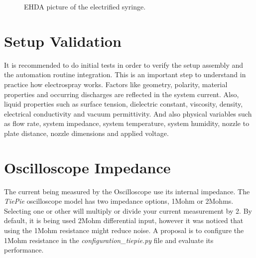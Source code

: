 \begin{figure}[H]
    \centering
    \label{fig:nozzleElectr}
    \caption{EHDA picture of the electrified syringe.}
\end{figure}


\section{Setup Validation}
\label{sec:setup_validation}


It is recommended to do initial tests in order to verify the setup assembly and the automation routine integration. 
This is an important step to understand in practice how electrospray works.
Factors like geometry, polarity, material properties and occurring discharges are reflected in the system current.
Also, liquid properties such as surface tension, dielectric constant, viscosity, density, electrical conductivity and vacuum permittivity. 
And also physical variables such as flow rate, system impedance, system temperature, system humidity, nozzle to plate distance, nozzle dimensions and applied voltage.


\section{Oscilloscope Impedance}
\label{sec:osc_impedance}

The current being measured by the Oscilloscope use its internal impedance. 
The \emph{TiePie} oscilloscope model has two impedance options, 1Mohm or 2Mohms. 
Selecting one or other will multiply or divide your current measurement by 2. 
By default, it is being used 2Mohm differential input, however it was noticed that using the 1Mohm resistance might reduce noise. 
A proposal is to configure the 1Mohm resistance in the \emph{configuration\_tiepie.py} file and evaluate its performance.